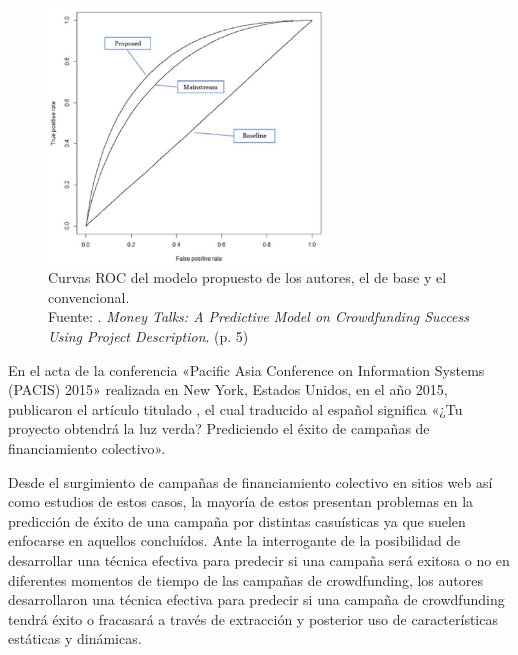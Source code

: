 \begin{figure}[!ht]
	\begin{center}
		\includegraphics[width=0.65\textwidth]{2/figures/zhou2015.jpg}
		\caption[Curvas ROC del modelo propuesto, el de base y el convencional]{Curvas ROC del modelo propuesto de los autores, el de base y el convencional.\\
		Fuente: \cite{pr_zhou2015projectdesc}. \textit{Money Talks: A Predictive Model on Crowdfunding Success Using Project Description}. (p. 5)}
		\label{2:fig113}
	\end{center}
\end{figure}

\clearpage
En el acta de la conferencia «Pacific Asia Conference on Information Systems (PACIS) 2015» realizada en New York, Estados Unidos, en el año 2015, \cite{pr_chen2015predcrowd} publicaron el artículo titulado , el cual traducido al español significa «¿Tu proyecto obtendrá la luz verda? Prediciendo el éxito de campañas de financiamiento colectivo».

Desde el surgimiento de campañas de financiamiento colectivo en sitios web así como estudios de estos casos, la mayoría de estos presentan problemas en la predicción de éxito de una campaña por distintas casuísticas ya que suelen enfocarse en aquellos concluídos. Ante la interrogante de la posibilidad de desarrollar una técnica efectiva para predecir si una campaña será exitosa o no en diferentes momentos de tiempo de las campañas de crowdfunding, los autores desarrollaron una técnica efectiva para predecir si una campaña de crowdfunding tendrá éxito o fracasará a través de extracción y posterior uso de características estáticas y dinámicas.

